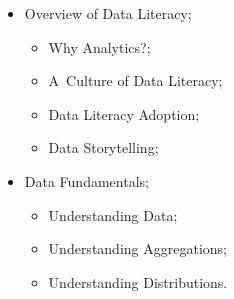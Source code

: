 \begin{itemize}
\tightlist
\item
  Overview of Data Literacy;

  \begin{itemize}
  \tightlist
  \item
    Why Analytics?;
  \item
    A~Culture of Data Literacy;
  \item
    Data Literacy Adoption;
  \item
    Data Storytelling;
  \end{itemize}
\item
  Data Fundamentals;

  \begin{itemize}
  \tightlist
  \item
    Understanding Data;
  \item
    Understanding Aggregations;
  \item
    Understanding Distributions.
  \end{itemize}
\end{itemize}
